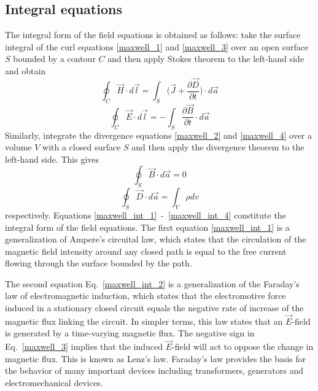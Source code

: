 \documentclass[12pt,a4paper,oneside]{book}
\begin{document}
\begin{onehalfspace}
\subsection{Integral equations}
The integral form of the field equations is obtained as follows: take the surface integral of the curl equations \ref{maxwell_1} and \ref{maxwell_3} over an open surface $S$ bounded by a contour $C$ and then apply Stokes theorem to the left-hand side and obtain
 \begin{equation}\label{maxwell_int_1}
	\oint_C\vec{H}\cdot d\vec{l}=\int_S\Big(\vec{J} + \frac{\partial \vec{D}}{\partial t}\Big)\cdot d\vec{a}
\end{equation}
\begin{equation}\label{maxwell_int_2}
	\oint_{C}\vec{E}\cdot d\vec{l}=-\int_{S}\frac{\partial \vec{B}}{\partial t}\cdot d\vec{a}
\end{equation}
Similarly, integrate the divergence equations \ref{maxwell_2} and \ref{maxwell_4} over a volume $V$ with a closed surface $S$ and then apply the divergence theorem to the left-hand side. This gives
\begin{equation}\label{maxwell_int_3}
	\oint_{S}\vec{B}\cdot d\vec{a}=0
\end{equation}
\begin{equation}\label{maxwell_int_4}
	\oint_{S}\vec{D}\cdot d\vec{a}=\int_{V}\rho dv
\end{equation}
respectively. Equations \eqref{maxwell_int_1}~-~\eqref{maxwell_int_4} constitute the integral form of the field equations. The first equation \eqref{maxwell_int_1} is a generalization of Ampere's circuital law, which states that the circulation of the magnetic field intensity around any closed path is equal to the free current flowing through the surface bounded by the path.

The second equation Eq.~\eqref{maxwell_int_2} is a generalization of the Faraday's law of electromagnetic induction, which states that the electromotive force induced in a stationary closed circuit equals the negative rate of increase of the magnetic flux linking the circuit. In simpler terms, this law states that an $\vec{E}$-field is generated by a time-varying magnetic flux. The negative sign in Eq.~\eqref{maxwell_3} implies that the induced $\vec{E}$-field will act to oppose the change in magnetic flux. This is known as Lenz's law. Faraday's law provides the basis for the behavior of many important devices including transformers, generators and electromechanical devices.


\end{onehalfspace}
\end{document}
